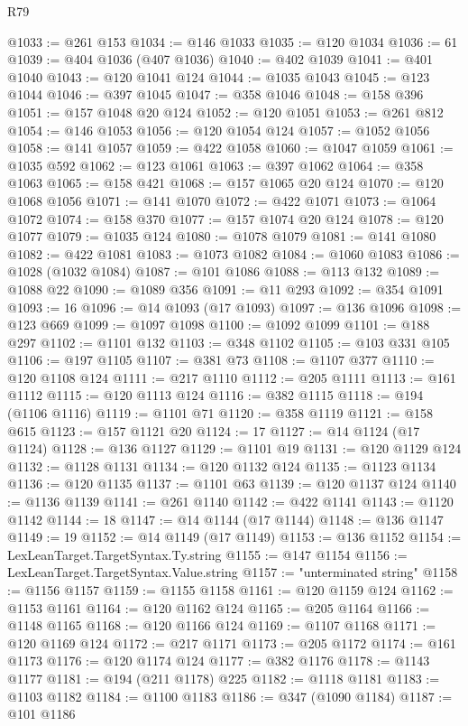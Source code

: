 \begin{lexlean}{R79}
\begin{coremodule}
@1033 := @261 @153
@1034 := @146 @1033
@1035 := @120 @1034
@1036 := 61
@1039 := @404 @1036 (@407 @1036)
@1040 := @402 @1039
@1041 := @401 @1040
@1043 := @120 @1041 @124
@1044 := @1035 @1043
@1045 := @123 @1044
@1046 := @397 @1045
@1047 := @358 @1046
@1048 := @158 @396
@1051 := @157 @1048 @20 @124
@1052 := @120 @1051
@1053 := @261 @812
@1054 := @146 @1053
@1056 := @120 @1054 @124
@1057 := @1052 @1056
@1058 := @141 @1057
@1059 := @422 @1058
@1060 := @1047 @1059
@1061 := @1035 @592
@1062 := @123 @1061
@1063 := @397 @1062
@1064 := @358 @1063
@1065 := @158 @421
@1068 := @157 @1065 @20 @124
@1070 := @120 @1068 @1056
@1071 := @141 @1070
@1072 := @422 @1071
@1073 := @1064 @1072
@1074 := @158 @370
@1077 := @157 @1074 @20 @124
@1078 := @120 @1077
@1079 := @1035 @124
@1080 := @1078 @1079
@1081 := @141 @1080
@1082 := @422 @1081
@1083 := @1073 @1082
@1084 := @1060 @1083
@1086 := @1028 (@1032 @1084)
@1087 := @101 @1086
@1088 := @113 @132
@1089 := @1088 @22
@1090 := @1089 @356
@1091 := @11 @293
@1092 := @354 @1091
@1093 := 16
@1096 := @14 @1093 (@17 @1093)
@1097 := @136 @1096
@1098 := @123 @669
@1099 := @1097 @1098
@1100 := @1092 @1099
@1101 := @188 @297
@1102 := @1101 @132
@1103 := @348 @1102
@1105 := @103 @331 @105
@1106 := @197 @1105
@1107 := @381 @73
@1108 := @1107 @377
@1110 := @120 @1108 @124
@1111 := @217 @1110
@1112 := @205 @1111
@1113 := @161 @1112
@1115 := @120 @1113 @124
@1116 := @382 @1115
@1118 := @194 (@1106 @1116)
@1119 := @1101 @71
@1120 := @358 @1119
@1121 := @158 @615
@1123 := @157 @1121 @20
@1124 := 17
@1127 := @14 @1124 (@17 @1124)
@1128 := @136 @1127
@1129 := @1101 @19
@1131 := @120 @1129 @124
@1132 := @1128 @1131
@1134 := @120 @1132 @124
@1135 := @1123 @1134
@1136 := @120 @1135
@1137 := @1101 @63
@1139 := @120 @1137 @124
@1140 := @1136 @1139
@1141 := @261 @1140
@1142 := @422 @1141
@1143 := @1120 @1142
@1144 := 18
@1147 := @14 @1144 (@17 @1144)
@1148 := @136 @1147
@1149 := 19
@1152 := @14 @1149 (@17 @1149)
@1153 := @136 @1152
@1154 := LexLeanTarget.TargetSyntax.Ty.string
@1155 := @147 @1154
@1156 := LexLeanTarget.TargetSyntax.Value.string
@1157 := "unterminated string"
@1158 := @1156 @1157
@1159 := @1155 @1158
@1161 := @120 @1159 @124
@1162 := @1153 @1161
@1164 := @120 @1162 @124
@1165 := @205 @1164
@1166 := @1148 @1165
@1168 := @120 @1166 @124
@1169 := @1107 @1168
@1171 := @120 @1169 @124
@1172 := @217 @1171
@1173 := @205 @1172
@1174 := @161 @1173
@1176 := @120 @1174 @124
@1177 := @382 @1176
@1178 := @1143 @1177
@1181 := @194 (@211 @1178) @225
@1182 := @1118 @1181
@1183 := @1103 @1182
@1184 := @1100 @1183
@1186 := @347 (@1090 @1184)
@1187 := @101 @1186

\end{coremodule}
\end{lexlean}
